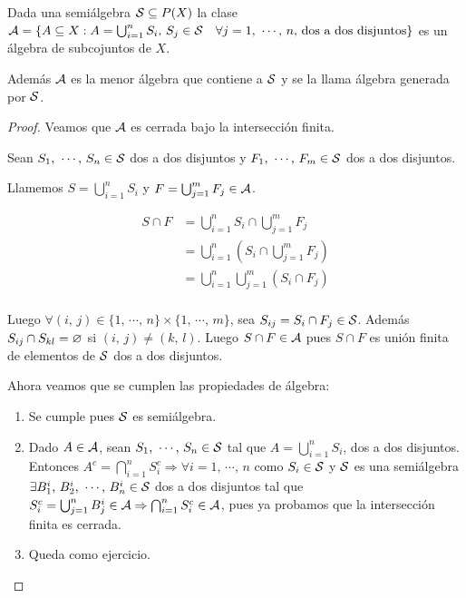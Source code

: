 \begin{lemma}
    Dada una semiálgebra \(\mathcal{S} \subseteq P(X)\) la clase \(\mathcal{A} = \{ A \subseteq X : A = \bigcup_{i = 1}^n S_i \text{, } S_j \in \mathcal{S} \quad \forall j = 1 \text{, }\cdots \text{, } n \text{, dos a dos disjuntos} \}\)
    es un álgebra de subcojuntos de \(X\).

    Además \(\mathcal{A}\) es la menor álgebra que contiene a \(\mathcal{S}\) y se la llama álgebra generada por \(\mathcal{S}\).

    \begin{proof}
        Veamos que \(\mathcal{A}\) es cerrada bajo la intersección finita.

        Sean \(S_1 \text{, } \cdots \text{, } S_n \in \mathcal{S}\) dos a dos disjuntos y \(F_1 \text{, } \cdots \text{, } F_m \in \mathcal{S}\) dos a dos disjuntos.

        Llamemos \(S = \bigcup_{i = 1}^n S_i\) y \(F = \bigcup_{j = 1}^m F_j \in \mathcal{A}\).

        \begin{align*}
            S \cap F & = \bigcup_{i = 1}^n S_i \cap \bigcup_{j = 1}^m F_j   \\
                     & = \bigcup_{i = 1}^n (S_i \cap \bigcup_{j = 1}^m F_j) \\
                     & = \bigcup_{i = 1}^n \bigcup_{j = 1}^m (S_i \cap F_j) \\
        \end{align*}

        Luego \(\forall (i\text{, } j) \in \{ 1 \text{, } \cdots \text{, } n \} \times \{ 1 \text{, } \cdots \text{, } m\}\), sea \(S_{ij} = S_i \cap F_j \in \mathcal{S}\).
        Además \(S_{ij} \cap S_{kl} = \varnothing\) si \((i\text{, } j) \neq (k \text{, } l)\).
        Luego \(S \cap F \in \mathcal{A}\) pues \(S \cap F\) es unión finita de elementos de \(\mathcal{S}\) dos a dos disjuntos.

        Ahora veamos que se cumplen las propiedades de álgebra:
        \begin{enumerate}
            \item Se cumple pues \(\mathcal{S}\) es semiálgebra.
            \item Dado \(A \in \mathcal{A}\), sean \(S_1 \text{, } \cdots \text{, } S_n \in \mathcal{S}\) tal que \(A = \bigcup_{i = 1}^n S_i\), dos a dos disjuntos. Entonces
                  \(A^c = \bigcap_{i = 1}^n S_i^c \Rightarrow \forall i = 1 \text{, } \cdots \text{, } n\) como \(S_i \in \mathcal{S}\) y \(\mathcal{S}\) es una semiálgebra \(\exists B_1^i \text{, } B_2^i \text{, } \cdots \text{, } B_n^i \in \mathcal{S}\) dos a dos disjuntos
                  tal que \(S_i^c = \bigcup_{j = 1}^n B_j^i \in \mathcal{A} \Rightarrow \bigcap_{i = 1}^n S_i^c \in \mathcal{A}\), pues ya probamos que la intersección finita es cerrada.
            \item Queda como ejercicio.
        \end{enumerate}
    \end{proof}
\end{lemma}
